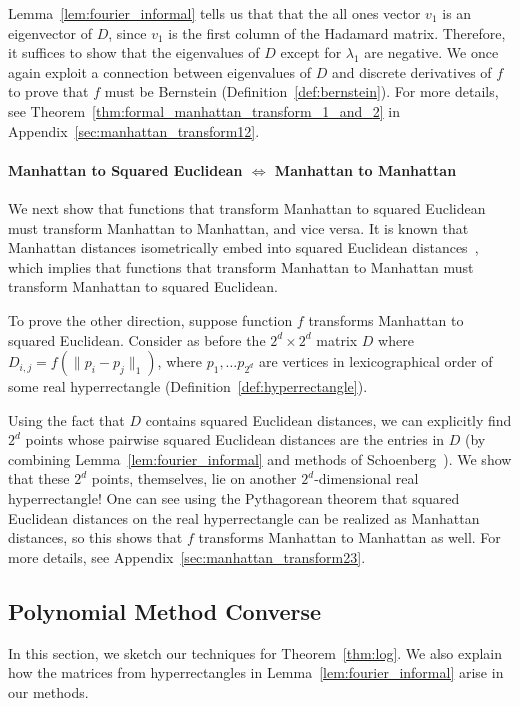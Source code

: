  Lemma~\ref{lem:fourier_informal} tells us that that the all ones vector $v_1$ is an eigenvector of $D$, since $v_1$ is the first column of the Hadamard matrix. Therefore, it suffices to show that the eigenvalues of $D$ except for $\lambda_1$ are negative. We once again exploit a connection between eigenvalues of $D$ and discrete derivatives of $f$ to prove that $f$ must be Bernstein (Definition~\ref{def:bernstein}). For more details, see  Theorem~\ref{thm:formal_manhattan_transform_1_and_2} in Appendix~\ref{sec:manhattan_transform12}.

 
\paragraph{Manhattan to Squared Euclidean $\Leftrightarrow$ Manhattan to Manhattan}
We next show that functions that transform Manhattan to squared Euclidean must transform Manhattan to Manhattan, and vice versa. It is known that Manhattan distances isometrically embed into squared Euclidean distances~\cite{s38, dl09}, which implies that functions that transform Manhattan to Manhattan must transform Manhattan to squared Euclidean. 

To prove the other direction, suppose function $f$ transforms Manhattan to squared Euclidean. Consider as before the $2^d \times 2^d$ matrix $D$ where $D_{i, j} = f(\|p_i - p_j\|_1)$, where $p_1, \ldots p_{2^d}$ are vertices in lexicographical order of some real hyperrectangle (Definition~\ref{def:hyperrectangle}). 

Using the fact that $D$ contains squared Euclidean distances, we can explicitly find $2^d$ points whose pairwise squared Euclidean distances are the entries in $D$ (by combining Lemma~\ref{lem:fourier_informal} and methods of Schoenberg~\cite{s35}). We show that these $2^d$ points, themselves, lie on another $2^d$-dimensional real hyperrectangle! One can see using the Pythagorean theorem that squared Euclidean distances on the real hyperrectangle can be realized as Manhattan distances, so this shows that $f$ transforms Manhattan to Manhattan as well. For more details, see Appendix~\ref{sec:manhattan_transform23}.

\subsection{Polynomial Method Converse}
In this section, we sketch our techniques for Theorem~\ref{thm:log}. We also explain how the matrices from hyperrectangles in Lemma~\ref{lem:fourier_informal} arise in our methods.

